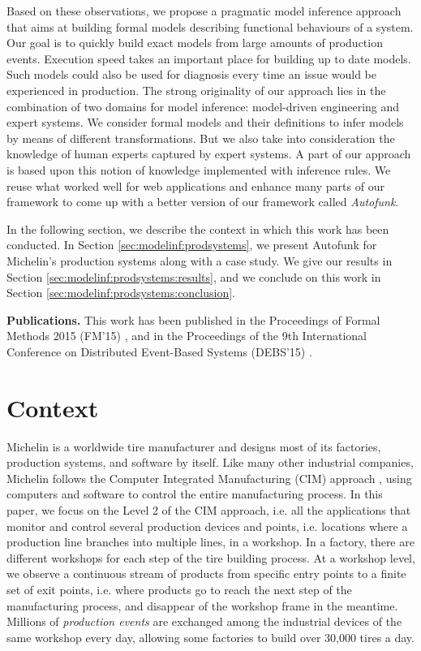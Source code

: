 Based on these observations, we propose a pragmatic model
inference approach that aims at building formal models describing
functional behaviours of a system. Our goal is to quickly build
exact models from large amounts of production events. Execution
speed takes an important place for building up to date models.
Such models could also be used for diagnosis every time an issue
would be experienced in production. The strong originality of our
approach lies in the combination of two domains for model
inference: model-driven engineering and expert systems. We
consider formal models and their definitions to infer models by
means of different transformations. But we also take into
consideration the knowledge of human experts captured by expert
systems. A part of our approach is based upon this notion of
knowledge implemented with inference rules. We reuse what worked
well for web applications and enhance many parts of our framework
to come up with a better version of our framework called
\textit{Autofunk}.

In the following section, we describe the context in which this
work has been conducted. In Section
\ref{sec:modelinf:prodsystems}, we present Autofunk for
Michelin's production systems along with a case study. We give
our results in Section \ref{sec:modelinf:prodsystems:results},
and we conclude on this work in Section
\ref{sec:modelinf:prodsystems:conclusion}.

\textbf{Publications.} This work has been published in the
Proceedings of Formal Methods 2015 (FM'15)
\cite{DBLP:conf/fm/DurandS15}, and in the Proceedings of the 9th
International Conference on Distributed Event-Based Systems
(DEBS'15) \cite{DBLP:conf/debs/SalvaD15}.

\section{Context}

Michelin is a worldwide tire manufacturer and designs most of its
factories, production systems, and software by itself.  Like
many other industrial companies, Michelin follows the Computer
Integrated Manufacturing (CIM) approach \cite{rehg2004computer},
using computers and software to control the entire manufacturing
process. In this paper, we focus on the Level 2 of the CIM
approach, i.e. all the applications that monitor and control
several production devices and points, i.e. locations where a
production line branches into multiple lines, in a workshop. In a
factory, there are different workshops for each step of the tire
building process. At a workshop level, we observe a continuous
stream of products from specific entry points to a finite set of
exit points, i.e. where products go to reach the next step of the
manufacturing process, and disappear of the workshop frame in the
meantime. Millions of \emph{production events} are exchanged
among the industrial devices of the same workshop every day,
allowing some factories to build over 30,000 tires a day.

